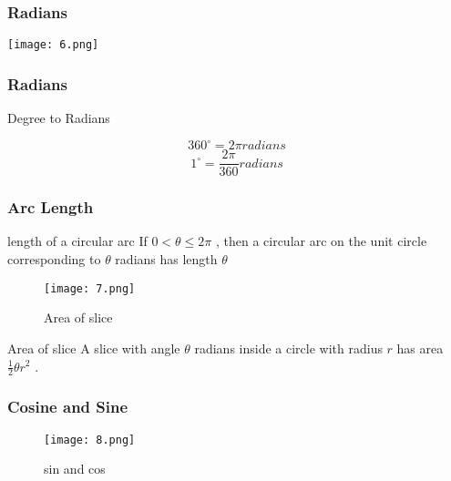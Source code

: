 \documentclass{beamer}
\begin{document}
\begin{frame}
    \frametitle{Radians}
    \centering
    \texttt{[image: 6.png]}
\end{frame}
\begin{frame}
    \frametitle{Radians}
   \begin{block}{Degree to Radians}

    $$ 360^{\circ} = 2 \pi radians $$
    $$ 1 ^{\circ}  = \frac{2 \pi}{360} radians $$
    
   \end{block}
\end{frame}

\begin{frame}
    \frametitle{Arc Length}
    \begin{block}{length of a circular arc}
        If $0 < \theta \leq 2\pi$ , then a circular arc on the unit circle corresponding to $\theta$ radians
        has length $\theta$         
    \end{block}
\end{frame}

\begin{frame}
        \begin{figure}[h]    
            \begin{minipage}[b]{0.3\textwidth}
            \centering
            \texttt{[image: 7.png]}
            \caption{Area of slice}
        \end{minipage}
    \end{figure}
    \begin{block}{Area of slice}
        A slice with angle $\theta$ radians inside a circle with radius $r$ has area $\frac{1}{2} \theta r^{2}$ .
    \end{block}
\end{frame}

\begin{frame}
    \frametitle{Cosine and Sine}
    \begin{figure}[h]    
        \begin{minipage}[b]{0.8\textwidth}
        \centering
        \texttt{[image: 8.png]}
        \caption{sin and cos}
    \end{minipage}
\end{figure}
\end{frame}
\end{document}
